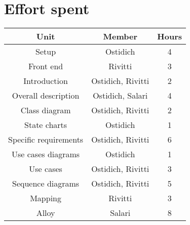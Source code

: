 \chapter{Effort spent}

\begin{table}[h]
    \centering
    \begin{tabular}{|c|c|c|}
        \hline \textbf{Unit} & \textbf{Member} & \textbf{Hours} \\
        \hline Setup & Ostidich & 4 \\
        \hline Front end & Rivitti & 3 \\
        \hline Introduction & Ostidich, Rivitti & 2 \\
        \hline Overall description & Ostidich, Salari & 4 \\
        \hline Class diagram & Ostidich, Rivitti & 2 \\
        \hline State charts & Ostidich & 1 \\
        \hline Specific requirements & Ostidich, Rivitti & 6 \\
        \hline Use cases diagrams & Ostidich & 1 \\
        \hline Use cases & Ostidich, Rivitti & 3 \\
        \hline Sequence diagrams & Ostidich, Rivitti & 5 \\
        \hline Mapping & Rivitti & 3 \\
        \hline Alloy & Salari & 8 \\
        \hline
    \end{tabular}
\end{table}

